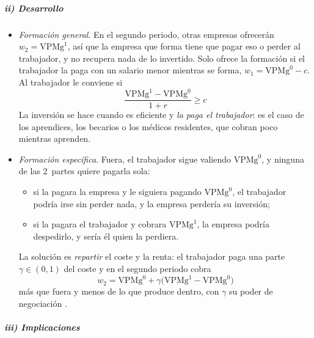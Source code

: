 \documentclass[11pt]{article}
\begin{document}
\subparagraph{ii) Desarrollo}

\begin{itemize}
\item \emph{Formación general}. En el segundo periodo, otras empresas ofrecerán $w_2=\mathrm{VPMg}^1$, así que la empresa que forma tiene que pagar eso o perder al trabajador, y no recupera nada de lo invertido. Solo ofrece la formación si el trabajador la paga con un salario menor mientras se forma, $w_1=\mathrm{VPMg}^0-c$. Al trabajador le conviene si
  \[
  \frac{\mathrm{VPMg}^1-\mathrm{VPMg}^0}{1+r}\geq c
  \]
  La inversión se hace cuando es eficiente y \emph{la paga el trabajador}: es el caso de los aprendices, los becarios o los médicos residentes, que cobran poco mientras aprenden.
\item \emph{Formación específica}. Fuera, el trabajador sigue valiendo $\mathrm{VPMg}^0$, y ninguna de las 2~partes quiere pagarla sola:
  \begin{itemize}
  \item si la pagara la empresa y le siguiera pagando $\mathrm{VPMg}^0$, el trabajador podría irse sin perder nada, y la empresa perdería su inversión;
  \item si la pagara el trabajador y cobrara $\mathrm{VPMg}^1$, la empresa podría despedirlo, y sería él quien la perdiera.
  \end{itemize}
  La solución es \emph{repartir} el coste y la renta: el trabajador paga una parte $\gamma\in(0,1)$ del coste y en el segundo periodo cobra
  \[
  w_2=\mathrm{VPMg}^0+\gamma\big(\mathrm{VPMg}^1-\mathrm{VPMg}^0\big)
  \]
  más que fuera y menos de lo que produce dentro, con $\gamma$ su poder de negociación .
\end{itemize}

\subparagraph{iii) Implicaciones}
\end{document}
